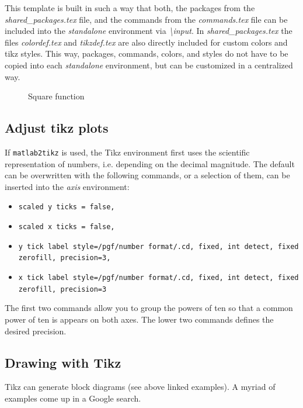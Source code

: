This template is built in such a way that both, the packages from the \textit{shared\_packages.tex} file, and the commands from the \textit{commands.tex} file can be included into the \textit{standalone} environment via \textit{\textbackslash input}.
In \textit{shared\_packages.tex} the files \textit{colordef.tex} and \textit{tikzdef.tex} are also directly included for custom colors and tikz styles. 
This way, packages, commands, colors, and styles do not have to be copied into each \textit{standalone} environment, but can be customized in a centralized way.

\begin{figure}[h]
	\centering
	
	\caption{Square function}
	\label{fig:tikz:x_square}
\end{figure}


\subsection{Adjust tikz plots}

If \texttt{matlab2tikz} is used, the Tikz environment first uses the scientific representation of numbers, i.e. depending on the decimal magnitude.
The default can be overwritten with the following commands, or a selection of them, can be inserted into the \textit{axis} environment:

\begin{itemize}
         \item \texttt{scaled y ticks = false,} 
         \item \texttt{scaled x ticks = false,}
         \item \texttt{y tick label style={/pgf/number format/.cd, fixed, int detect, fixed zerofill, precision=3},}
         \item \texttt{x tick label style={/pgf/number format/.cd, fixed, int detect, fixed zerofill, precision=3}}
\end{itemize}

The first two commands allow you to group the powers of ten so that a common power of ten is appears on both axes.
The lower two commands defines the desired precision.


\subsection{Drawing with Tikz}

Tikz can generate block diagrams (see above linked examples).
A myriad of examples come up in a Google search.

